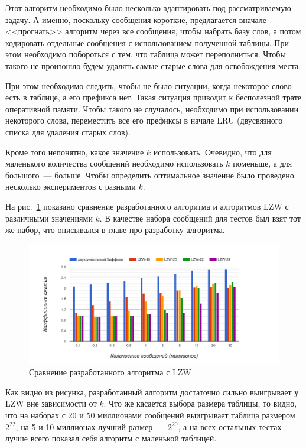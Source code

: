 Этот алгоритм необходимо было несколько адаптировать под рассматриваемую задачу. А именно, поскольку сообщения короткие, предлагается вначале 
<<прогнать>> алгоритм через все сообщения, чтобы набрать базу слов, а потом кодировать отдельные сообщения с использованием полученной таблицы.
При этом необходимо побороться с тем, что таблица может переполниться. Чтобы такого не произошло будем удалять самые старые слова для освобождения места.

При этом необходимо следить, чтобы не было ситуации, когда некоторое слово есть в таблице, а его префикса нет. Такая ситуация приводит к бесполезной трате оперативной памяти.
Чтобы такого не случалось, необходимо при использовании некоторого слова, переместить все его префиксы в начале LRU (двусвязного списка для удаления старых слов).

Кроме того непонятно, какое значение $k$ использовать. Очевидно, что для маленького количества сообщений необходимо использовать $k$ поменьше, а для большого~--- больше. 
Чтобы определить оптимальное значение было проведено несколько экспериментов с разными $k$.

На рис.~\ref{fig11} показано сравнение разработанного алгоритма и алгоритмов LZW с различными значениями $k$. В качестве набора сообщений для тестов был взят тот же набор,
что описывался в главе про разработку алгоритма.

\begin{figure}[h!]
  \includegraphics[width=\linewidth]{pics/lzw.png}
  \caption{Сравнение разработанного алгоритма с LZW}
  \label{fig11}
\end{figure}

Как видно из рисунка, разработанный алгоритм достаточно сильно выигрывает у LZW вне зависимости от $k$. Что же касается выбора размера таблицы, то видно,
что на наборах с 20 и 50 миллионами сообщений выигрывает таблица размером $2^{22}$, на 5 и 10 миллионах лучший размер~--- $2^{20}$, а на всех остальных тестах лучше всего
показал себя алгоритм с маленькой таблицей.

